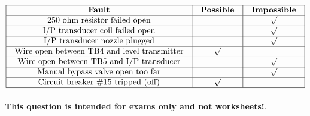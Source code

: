 






$$\vbox{\offinterlineskip
\halign{\strut
\vrule \quad\hfil # \ \hfil & 
\vrule \quad\hfil # \ \hfil & 
\vrule \quad\hfil # \ \hfil \vrule \cr
\noalign{\hrule}
%
{\bf Fault} & {\bf Possible} & {\bf Impossible} \cr
%
\noalign{\hrule}
%
250 ohm resistor failed open &  & $\surd$ \cr
%
\noalign{\hrule}
%
I/P transducer coil failed open &  & $\surd$ \cr
%
\noalign{\hrule}
%
I/P transducer nozzle plugged &  & $\surd$ \cr
%
\noalign{\hrule}
%
Wire open between TB4 and level transmitter & $\surd$ &  \cr
%
\noalign{\hrule}
%
Wire open between TB5 and I/P transducer &  & $\surd$ \cr
%
\noalign{\hrule}
%
Manual bypass valve open too far &  & $\surd$ \cr
%
\noalign{\hrule}
%
Circuit breaker \#15 tripped (off) & $\surd$ &  \cr
%
\noalign{\hrule}
} %
}$$ %







{\bf This question is intended for exams only and not worksheets!}.



